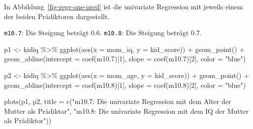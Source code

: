 \documentclass[
  a4paper,
  DIV=11]{scrreprt}
\newenvironment{Shaded}{\begin{snugshade}}{\end{snugshade}}
\newcommand{\AttributeTok}[1]{\textcolor[rgb]{0.40,0.45,0.13}{#1}}
\newcommand{\DecValTok}[1]{\textcolor[rgb]{0.68,0.00,0.00}{#1}}
\newcommand{\FloatTok}[1]{\textcolor[rgb]{0.68,0.00,0.00}{#1}}
\newcommand{\FunctionTok}[1]{\textcolor[rgb]{0.28,0.35,0.67}{#1}}
\newcommand{\NormalTok}[1]{\textcolor[rgb]{0.00,0.23,0.31}{#1}}
\newcommand{\OtherTok}[1]{\textcolor[rgb]{0.00,0.23,0.31}{#1}}
\newcommand{\SpecialCharTok}[1]{\textcolor[rgb]{0.37,0.37,0.37}{#1}}
\newcommand{\StringTok}[1]{\textcolor[rgb]{0.13,0.47,0.30}{#1}}
\theoremstyle{definition}
\theoremstyle{remark}
\begin{document}
In Abbildung~\ref{fig-regr-one-pred} ist die univariate Regression mit
jeweils einem der beiden Prädiktoren dargestellt.

\texttt{m10.7}: Die Steigung beträgt 0.6. \texttt{m10.8}: Die Steigung
beträgt 0.7.

\begin{Shaded}
\begin{Highlighting}[]
\NormalTok{p1 }\OtherTok{\textless{}{-}} 
\NormalTok{  kidiq }\SpecialCharTok{\%\textgreater{}\%} 
  \FunctionTok{ggplot}\NormalTok{(}\FunctionTok{aes}\NormalTok{(}\AttributeTok{x =}\NormalTok{ mom\_iq, }\AttributeTok{y =}\NormalTok{ kid\_score)) }\SpecialCharTok{+}
  \FunctionTok{geom\_point}\NormalTok{() }\SpecialCharTok{+}
  \FunctionTok{geom\_abline}\NormalTok{(}\AttributeTok{intercept =} \FunctionTok{coef}\NormalTok{(m10}\FloatTok{.7}\NormalTok{)[}\DecValTok{1}\NormalTok{],}
              \AttributeTok{slope =} \FunctionTok{coef}\NormalTok{(m10}\FloatTok{.7}\NormalTok{)[}\DecValTok{2}\NormalTok{],}
              \AttributeTok{color =} \StringTok{"blue"}\NormalTok{) }

\NormalTok{p2 }\OtherTok{\textless{}{-}} 
\NormalTok{kidiq }\SpecialCharTok{\%\textgreater{}\%} 
  \FunctionTok{ggplot}\NormalTok{(}\FunctionTok{aes}\NormalTok{(}\AttributeTok{x =}\NormalTok{ mom\_age, }\AttributeTok{y =}\NormalTok{ kid\_score)) }\SpecialCharTok{+}
  \FunctionTok{geom\_point}\NormalTok{() }\SpecialCharTok{+}
  \FunctionTok{geom\_abline}\NormalTok{(}\AttributeTok{intercept =} \FunctionTok{coef}\NormalTok{(m10}\FloatTok{.8}\NormalTok{)[}\DecValTok{1}\NormalTok{],}
              \AttributeTok{slope =} \FunctionTok{coef}\NormalTok{(m10}\FloatTok{.8}\NormalTok{)[}\DecValTok{2}\NormalTok{],}
              \AttributeTok{color =} \StringTok{"blue"}\NormalTok{)}

\FunctionTok{plots}\NormalTok{(p1, p2,}
      \AttributeTok{title =} \FunctionTok{c}\NormalTok{(}\StringTok{"m10.7: Die univariate Regression mit dem Alter der Mutter als Prädiktor"}\NormalTok{,}
        \StringTok{"m10.8: Die univariate Regression mit dem IQ der Mutter als Prädiktor"}\NormalTok{))}
\end{Highlighting}
\end{Shaded}
\end{document}
